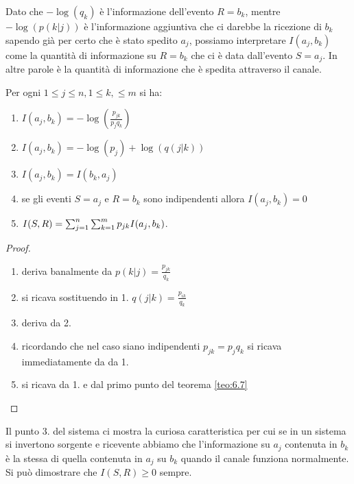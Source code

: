 Dato che $- \log(q_k)$ è l'informazione dell'evento $R=b_k$, mentre $- \log(p(k|j))$ è l'informazione aggiuntiva che ci darebbe la ricezione di $b_k$ sapendo già per certo che è stato spedito $a_j$, possiamo interpretare $I(a_j,b_k)$ come la quantità di informazione su $R=b_k$ che ci è data dall'evento $S=a_j$. In altre parole è la quantità di informazione che è spedita attraverso il canale.
\begin{teo}
Per ogni $1\leq j \leq n , 1 \leq k, \leq m$ si ha:
\begin{enumerate}
\item $I(a_j,b_k)=- \log(\frac{p_{jk}}{p_j q_k})$
\item $I(a_j,b_k)=- \log(p_j)+ \log(q(j|k))$
\item $I(a_j,b_k)=I(b_k,a_j)$
\item se gli eventi $S=a_j$ e $R=b_k$ sono indipendenti allora $I(a_j,b_k)=0$
\item $I(S,R)=\sum_{j=1}^n \sum_{k=1}^m p_{jk}I(a_j,b_k)$.
\end{enumerate}
\end{teo}
\begin{proof}
\begin{enumerate}
\item deriva banalmente da $p(k|j)=\frac{p_{jk}}{q_k}$
\item si ricava sostituendo in 1. $q(j|k)=\frac{p_{ik}}{q_k}$
\item deriva da 2.
\item ricordando che nel caso siano indipendenti $p_{jk}=p_jq_k$ si ricava immediatamente da da 1.
\item si ricava da 1. e dal primo punto del teorema \ref{teo:6.7}
\end{enumerate}
\end{proof}
Il punto 3. del sistema ci mostra la curiosa caratteristica per cui se in un sistema si invertono sorgente e ricevente abbiamo che l'informazione su $a_j$ contenuta in $b_k$ è la stessa di quella contenuta in $a_j$ su $b_k$ quando il canale funziona normalmente. Si può dimostrare che $I(S,R)\geq 0$ sempre.


